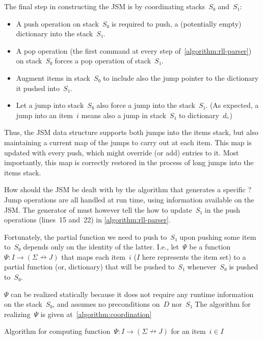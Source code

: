 The final step in constructing the JSM is by coordinating
  stacks~$S₀$ and~$S₁$:
  \begin{itemize}
      \item A push operation on stack~$S₀$ is required to push, a (potentially
        empty) dictionary into the stack~$S₁$.
      \item A pop operation (the first command at every step of~\cref{algorithm:rll-parser})
        on stack~$S₀$ forces a pop operation of stack~$S₁$.
      \item Augment items in stack~$S₀$ to include also the jump pointer to
        the dictionary it pushed into~$S₁$.
      \item Let a jump into stack~$S₀$ also
          force a jump into the stack~$S₁$.
          (As expected, a jump into an item~$i$ means also a jump
            in stack~$S₁$ to dictionary~$dᵢ$.)
  \end{itemize}
Thus, the JSM data structure supports both
  jumps into the items stack, but also maintaining
  a current map of the jumps to carry out at each item.
This map is updated with every push, which might
  override (or add) entries to it.
Most importantly, this map is correctly restored
  in the process of long jumps into the items stack.

How should the JSM be dealt with by the algorithm that generates
  a specific \RLLp?
Jump operations are all handled at run time,
  using information available on the JSM.
The generator of \RLLp must however tell the \RLLp how to
  update~$S₁$ in the push operations (lines~15 and~22) in
  \cref{algorithm:rll-parser}.

Fortunately, the partial function we need to push to~$S₁$ upon
  pushing some item to~$S₀$ depends only on the identity of the latter.
  I.e., let~$Ψ$ be a function~$Ψ: I→(Σ↛J)$ that maps each item~$i$ ($I$ here represents
  the item set) to a partial function (or, dictionary) that will be pushed to~$S₁$
  whenever~$S₀$ is pushed to~$S₀$.

$Ψ$ can be realized statically because it does not require any runtime
  information on the stack~$S₀$, and assumes no preconditions on~$D$ nor~$S₁$
  The algorithm for realizing~$Ψ$ is given at~\cref{algorithm:coordination}

\begin{algorithm}
  \begin{algorithmic}
  \caption{\label{algorithm:coordination}
  Algorithm for computing function~$Ψ: I→(Σ↛J)$ for
  an item~$i∈I$}
   
   
      \BREAK
    \FI
       
      \FI
    \ENDFOR
  \ENDFOR
  \end{algorithmic}
\end{algorithm}

